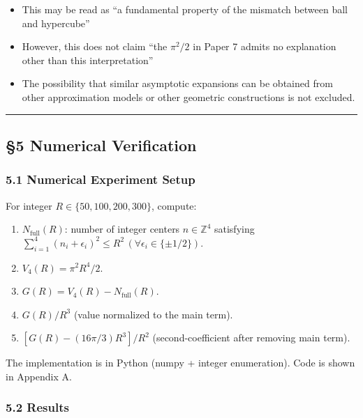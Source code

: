 \documentclass[
]{article}
\providecommand{\tightlist}{%
  \setlength{\itemsep}{0pt}\setlength{\parskip}{0pt}}
\begin{document}
\begin{itemize}
\tightlist
\item
  This may be read as ``a fundamental property of the mismatch between
  ball and hypercube''
\item
  However, this does not claim ``the \(\pi^2/2\) in Paper 7 admits no
  explanation other than this interpretation''
\item
  The possibility that similar asymptotic expansions can be obtained
  from other approximation models or other geometric constructions is
  not excluded.
\end{itemize}

\begin{center}\rule{0.5\linewidth}{0.5pt}\end{center}

\subsection{§5 Numerical Verification}\label{numerical-verification}

\subsubsection{5.1 Numerical Experiment
Setup}\label{numerical-experiment-setup}

For integer \(R \in \{50, 100, 200, 300\}\), compute:

\begin{enumerate}
\def\labelenumi{\arabic{enumi}.}
\tightlist
\item
  \(N_{\text{full}}(R)\): number of integer centers
  \(n \in \mathbb{Z}^4\) satisfying
  \(\sum_{i=1}^4 (n_i + \epsilon_i)^2 \le R^2 \, (\forall \epsilon_i \in \{\pm 1/2\})\).
\item
  \(V_4(R) = \pi^2 R^4/2\).
\item
  \(G(R) = V_4(R) - N_{\text{full}}(R)\).
\item
  \(G(R)/R^3\) (value normalized to the main term).
\item
  \([G(R) - (16\pi/3)R^3]/R^2\) (second-coefficient after removing main
  term).
\end{enumerate}

The implementation is in Python (numpy + integer enumeration). Code is
shown in Appendix A.

\subsubsection{5.2 Results}\label{results}
\end{document}
